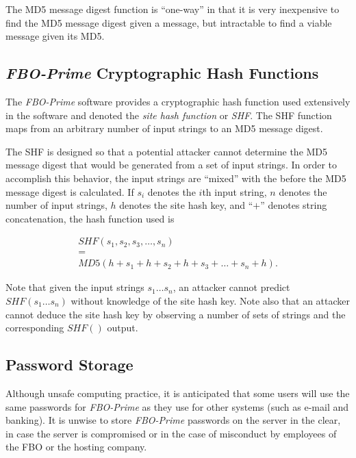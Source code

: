 \documentclass[letterpaper,10pt,titlepage]{article}
\newcommand{\productbasename}{FBO-Prime}
\begin{document}
The MD5 message digest function is ``one-way'' in that it is very inexpensive to
find the MD5 message digest given a message, but intractable to find a viable message
given its MD5.



\subsection{\emph{\productbasename{}} Cryptographic Hash Functions}
\label{stbg0:sfch0}

The \emph{\productbasename{}} software provides a cryptographic hash function
used extensively in the software and denoted
the \emph{site hash function} or \emph{SHF}\@.  
The SHF function maps from an arbitrary number 
of input strings to
an MD5 message digest.

The SHF is designed so that a potential attacker
cannot determine the MD5 message digest that would be generated from 
a set of input strings.  In order to accomplish this behavior, 
the input strings are ``mixed'' with the
 before the MD5 message digest is calculated.
If $s_i$ denotes the $i$th input string, $n$ denotes the number of
input strings, $h$ denotes the site hash key,
and ``$+$'' denotes string concatenation, the hash function used is

\begin{eqnarray}
\nonumber
& SHF(s_1, s_2, s_3, \ldots{}, s_n)& \\
\label{eq:stbg0:sfch0:00}
& = & \\
\nonumber
& MD5(h + s_1 + h + s_2 + h + s_3 + \ldots{} + s_n + h)  . &
\end{eqnarray}

Note that given the input strings $s_1 \ldots{} s_n$, an attacker
cannot predict $SHF(s_1 \ldots{} s_n)$ without
knowledge of the site hash key.  Note also that an attacker cannot deduce
the site hash key by observing a number of sets of strings and the
corresponding $SHF()$ output.


\subsection{Password Storage}
\label{stbg0:spst0}

Although unsafe computing practice, it is anticipated that 
some users will use the same passwords for \emph{\productbasename{}} 
as they use for other systems (such as e-mail and banking).  It is unwise
to store \emph{\productbasename{}} passwords on the server in the clear,
in case the server is compromised or in the case of misconduct by
employees of the FBO or the hosting company.
\end{document}
